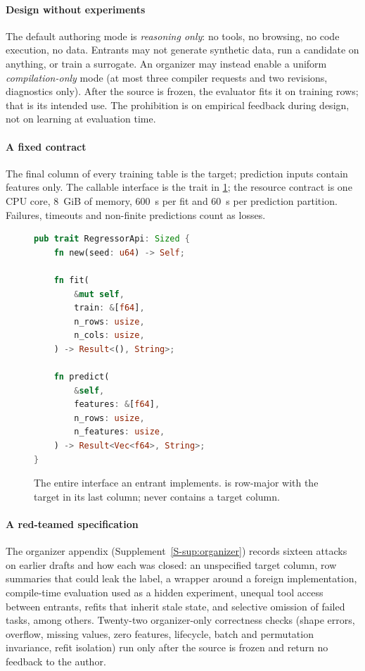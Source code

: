 \paragraph{Design without experiments} The default authoring mode is \emph{reasoning only}: no
tools, no browsing, no code execution, no data. Entrants may not generate synthetic data, run
a candidate on anything, or train a surrogate. An organizer may instead enable a uniform
\emph{compilation-only} mode (at most three compiler requests and two revisions, diagnostics
only). After the source is frozen, the evaluator fits it on training rows; that is its
intended use. The prohibition is on empirical feedback during design, not on learning at
evaluation time.

\paragraph{A fixed contract} The final column of every training table is the target; prediction
inputs contain features only. The callable interface is the trait in \cref{lst:trait}; the
resource contract is one CPU core, \SI{8}{GiB} of memory, \SI{600}{s} per fit and \SI{60}{s}
per prediction partition. Failures, timeouts and non-finite predictions count as losses.

\begin{figure}[t]
\centering
\begin{minipage}{0.62\linewidth}
\begin{lstlisting}[language=Rust, numbers=none, xleftmargin=6pt, basicstyle=\ttfamily\fontsize{7.6pt}{9.2pt}\selectfont]
pub trait RegressorApi: Sized {
    fn new(seed: u64) -> Self;

    fn fit(
        &mut self,
        train: &[f64],
        n_rows: usize,
        n_cols: usize,
    ) -> Result<(), String>;

    fn predict(
        &self,
        features: &[f64],
        n_rows: usize,
        n_features: usize,
    ) -> Result<Vec<f64>, String>;
}
\end{lstlisting}
\end{minipage}
\caption{The entire interface an entrant implements.  is row-major with the target
in its last column;  never contains a target column.}
\label{lst:trait}
\end{figure}

\paragraph{A red-teamed specification} The organizer appendix (Supplement~\ref{S-sup:organizer}) records
sixteen attacks on earlier drafts and how each was closed: an unspecified target column, row
summaries that could leak the label, a wrapper around a foreign implementation, compile-time
evaluation used as a hidden experiment, unequal tool access between entrants, refits that
inherit stale state, and selective omission of failed tasks, among others. Twenty-two
organizer-only correctness checks (shape errors, overflow, missing values, zero features,
lifecycle, batch and permutation invariance, refit isolation) run only after the source is
frozen and return no feedback to the author.

